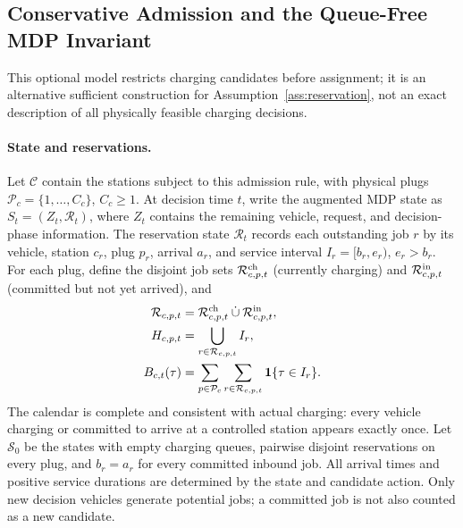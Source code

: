 \subsection{Conservative Admission and the Queue-Free MDP Invariant}
\label{app:conservative_admission}
This optional model restricts charging candidates before assignment;
it is an alternative sufficient construction for
Assumption~\ref{ass:reservation}, not an exact description of all
physically feasible charging decisions.

\paragraph{State and reservations.}
Let $\mathcal C$ contain the stations subject to this admission rule,
with physical plugs $\mathcal P_c=\{1,\ldots,C_c\}$, $C_c\ge1$.
At decision time $t$, write the augmented MDP state as
$S_t=(Z_t,\mathcal R_t)$, where $Z_t$ contains the remaining vehicle,
request, and decision-phase information. The reservation state
$\mathcal R_t$ records each outstanding job $r$ by its vehicle,
station $c_r$, plug $p_r$, arrival $a_r$, and service interval
$I_r=[b_r,e_r)$, $e_r>b_r$.
For each plug, define the disjoint job sets
$\mathcal R^{\rm ch}_{c,p,t}$ (currently charging) and
$\mathcal R^{\rm in}_{c,p,t}$ (committed but not yet arrived), and
\begin{equation}
\begin{aligned}
\mathcal R_{c,p,t}&=\mathcal R^{\rm ch}_{c,p,t}
                     \mathbin{\dot\cup}\mathcal R^{\rm in}_{c,p,t},\\
H_{c,p,t}&=\bigcup_{r\in\mathcal R_{c,p,t}} I_r,\\
B_{c,t}(\tau)&=\sum_{p\in\mathcal P_c}
               \sum_{r\in\mathcal R_{c,p,t}}\mathbf1\{\tau\in I_r\}.
\end{aligned}
\label{eq:conservative_background}
\end{equation}
The calendar is complete and consistent with actual charging: every
vehicle charging or committed to arrive at a controlled station appears
exactly once. Let $\mathcal S_0$ be the states with
empty charging queues, pairwise disjoint reservations on every plug,
and $b_r=a_r$ for every committed inbound job. All arrival times and
positive service durations are determined by the state and candidate
action. Only new decision vehicles generate potential jobs; a committed
job is not also counted as a new candidate.

